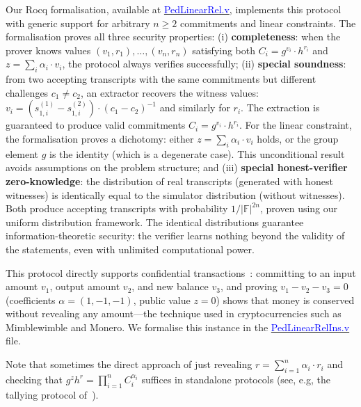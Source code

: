 Our Rocq formalisation, available at \href{https://anonymous.4open.science/r/SigmaProtocol-EBA5/src/Crypto/PedLinearRel.v}{\textcolor{blue}{PedLinearRel.v}}, implements this protocol with generic support for arbitrary $n \geq 2$ commitments and linear constraints. The formalisation proves all three security properties: (i) \textbf{completeness}: when the prover knows values $(v_1, r_1), \ldots, (v_n, r_n)$ satisfying both $C_i = g^{v_i} \cdot h^{r_i}$ and $z = \sum_i \alpha_i \cdot v_i$, the protocol always verifies successfully; (ii) \textbf{special soundness}: from two accepting transcripts with the same commitments but different challenges $c_1 \neq c_2$,
an extractor recovers the witness values: $v_i = (s_{1,i}^{(1)} - s_{1,i}^{(2)}) \cdot (c_1 - c_2)^{-1}$
and similarly for $r_i$. The extraction is guaranteed to produce valid commitments $C_i = g^{v_i} \cdot h^{r_i}$.
For the linear constraint, the formalisation proves a dichotomy: either $z = \sum_i \alpha_i \cdot v_i$ holds,
or the group element $g$ is the identity (which is a degenerate case). This unconditional result avoids
assumptions on the problem structure; and (iii) \textbf{special honest-verifier zero-knowledge}:
the distribution of real transcripts (generated with honest witnesses) is identically equal to the
simulator distribution (without witnesses). Both produce accepting transcripts with probability
$1/|\mathbb{F}|^{2n}$, proven using our uniform distribution framework. The identical distributions
guarantee information-theoretic security: the verifier learns nothing beyond the validity of the
statements, even with unlimited computational power.

This protocol directly supports confidential transactions~\cite{10.1007/978-3-030-17653-2_22}: committing to an input amount $v_1$, output amount $v_2$, and new balance $v_3$, and proving $v_1 - v_2 - v_3 = 0$ (coefficients $\alpha = (1, -1, -1)$, public value $z = 0$) shows that money is conserved without revealing any amount---the technique used in cryptocurrencies such as Mimblewimble and Monero. We formalise this instance in the \href{https://anonymous.4open.science/r/SigmaProtocol-EBA5/src/Examples/PedLinearRelIns.v}{\textcolor{blue}{PedLinearRelIns.v}} file.

Note that sometimes the direct approach of just revealing $r=\sum_{i=1}^{n} \alpha_i \cdot r_i$ and checking that $g^z h^r = \prod_{i=1}^n C_i^{\alpha_i}$ suffices in standalone protocols (see, e.g, the tallying protocol of~\cite{CFSY96}).
